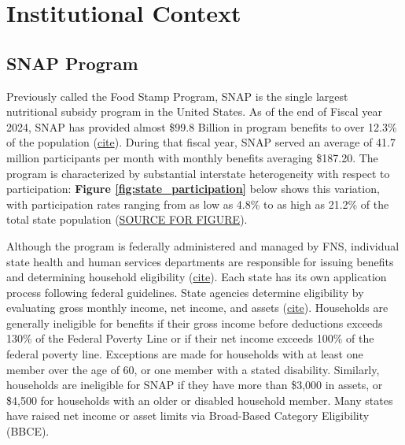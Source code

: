 \documentclass[12pt]{article}
\begin{document}




\section{Institutional Context}

\subsection{SNAP Program}

Previously called the Food Stamp Program, SNAP is the single largest nutritional subsidy program in the United States. As of the end of Fiscal year 2024, SNAP has provided almost \$99.8 Billion in program benefits to over 12.3\% of the population (\href{https://www.ers.usda.gov/topics/food-nutrition-assistance/supplemental-nutrition-assistance-program-snap/key-statistics-and-research}{cite}). During that fiscal year, SNAP served an average of 41.7 million participants per month with monthly benefits averaging \$187.20. The program is characterized by substantial interstate heterogeneity with respect to participation: \textbf{Figure \ref{fig:state_participation}} below shows this variation, with participation rates ranging from as low as 4.8\% to as high as 21.2\% of the total state population (\href{https://www.ers.usda.gov/topics/food-nutrition-assistance/supplemental-nutrition-assistance-program-snap/key-statistics-and-research}{SOURCE FOR FIGURE}).

Although the program is federally administered and managed by FNS, individual state health and human services departments are responsible for issuing benefits and determining household eligibility (\href{https://www.usda.gov/sites/default/files/documents/snap_fact_sheet.pdf}{cite}). Each state has its own application process following federal guidelines. State agencies determine eligibility by evaluating gross monthly income, net income, and assets (\href{https://www.cbpp.org/research/food-assistance/a-quick-guide-to-snap-eligibility-and-benefits}{cite}). Households are generally ineligible for benefits if their gross income before deductions exceeds 130\% of the Federal Poverty Line or if their net income exceeds 100\% of the federal poverty line. Exceptions are made for households with at least one member over the age of 60, or one member with a stated disability. Similarly, households are ineligible for SNAP if they have more than \$3,000 in assets, or \$4,500 for households with an older or disabled household member. Many states have raised net income or asset limits via Broad-Based Category Eligibility (BBCE).
\end{document}
